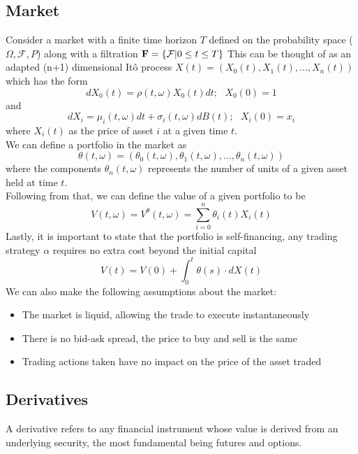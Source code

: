 \documentclass[12pt]{article}
\numberwithin{equation}{section}
\begin{document}
\subsection{Market}
Consider a market with a finite time horizon $T$ defined on the probability space 
($\Omega,\mathcal{F},P$) along with a filtration $\bold{F} = \{\mathcal{F}| 0 \leq t \leq T \}$ 
This can be thought of as an adapted (n+1) dimensional It\^{o} process 
$X(t) = (X_0(t), X_1(t),...,X_n(t))$
which has the form 
\begin{equation}
dX_0(t) = \rho(t,\omega)X_0(t)dt;\hspace{8pt}X_0(0)=1
\end{equation}and
\begin{equation}
dX_i = \mu_i(t,\omega)dt+\sigma_i(t,\omega)dB(t);\hspace{8pt}X_i(0)=x_i 
\end{equation}
where $X_i(t)$ as the price of asset $i$ at a given time $t$.
\\
We can define a portfolio in the market as 
\begin{equation}
\theta(t,\omega) = (\theta_0(t,\omega),\theta_1(t,\omega),...,\theta_n(t,\omega))
\end{equation}
where the components $\theta_n(t,\omega)$ represents the number of units of a given 
asset held at time $t$.\\
Following from that, we can define the value of a given portfolio to be 
\begin{equation}
  V(t,\omega) = V^{\theta}(t,\omega) = \sum_{i=0}^n \theta_i(t)X_i(t)
\end{equation}
Lastly, it is important to state that the portfolio is self-financing, any 
trading strategy $\alpha$ requires no extra cost beyond the initial capital
\begin{equation}
  V(t) = V(0) + \int_0^t\theta(s)\cdot dX(t)
\end{equation}
We can also make the following assumptions about the market:
\begin{itemize}
  \item The market is liquid, allowing the trade to execute instantaneously
  \item There is no bid-ask spread, the price to buy and sell is the same 
  \item Trading actions taken have no impact on the price of the asset traded 
\end{itemize}


\subsection{Derivatives}
A derivative refers to any financial instrument whose value is derived from an 
underlying security, the most fundamental being futures and options.
\end{document}

